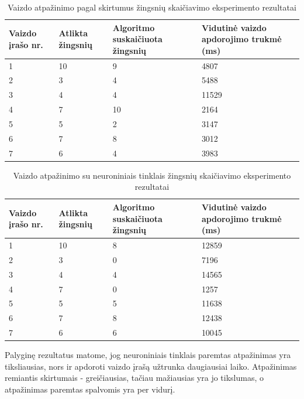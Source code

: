 \documentclass{VUMIFPSbakalaurinis}
\begin{document}
\begin{table}[H]\footnotesize
	\centering
	\caption{Vaizdo atpažinimo pagal skirtumus žingsnių skaičiavimo eksperimento rezultatai}
	{\begin{tabular}{|p{3cm}|p{3cm}|p{3cm}|p{3cm}|} \hline
			\textbf{Vaizdo įrašo nr.} & \textbf{Atlikta žingsnių} & \textbf{Algoritmo suskaičiuota žingsnių} & \textbf{Vidutinė vaizdo apdorojimo trukmė (ms)} \\
			\hline
			1  & 10    & 9    & 4807    \\
			\hline
			2  & 3    & 4  & 5488     \\
			\hline
			3  & 4    & 4   & 11529    \\
			\hline
			4  & 7    & 10  & 2164     \\
			\hline
			5  & 5    & 2  & 3147     \\
			\hline
			6  & 7    & 8  & 3012     \\
			\hline
			7  & 6    & 4  & 3983     \\
			\hline
	\end{tabular}}
	\label{tab:diffresults}
\end{table}

\begin{table}[H]\footnotesize
	\centering
	\caption{Vaizdo atpažinimo su neuroniniais tinklais žingsnių skaičiavimo eksperimento rezultatai}
	{\begin{tabular}{|p{3cm}|p{3cm}|p{3cm}|p{3cm}|} \hline
			\textbf{Vaizdo įrašo nr.} & \textbf{Atlikta žingsnių} & \textbf{Algoritmo suskaičiuota žingsnių} & \textbf{Vidutinė vaizdo apdorojimo trukmė (ms)} \\
			\hline
			1  & 10    & 8    & 12859    \\
			\hline
			2  & 3    & 0  & 7196     \\
			\hline
			3  & 4    & 4   & 14565    \\
			\hline
			4  & 7    & 0  & 1257     \\
			\hline
			5  & 5    & 5  & 11638     \\
			\hline
			6  & 7    & 8  & 12438     \\
			\hline
			7  & 6    & 6  & 10045     \\
			\hline
	\end{tabular}}
	\label{tab:poseresults}
\end{table}

Palyginę rezultatus matome, jog neuroniniais tinklais paremtas atpažinimas yra tiksliausias, nors ir apdoroti vaizdo įrašą užtrunka daugiausiai laiko. Atpažinimas remiantis skirtumais - greičiausias, tačiau mažiausias yra jo tikslumas, o atpažinimas paremtas spalvomis yra per vidurį. 
\end{document}
